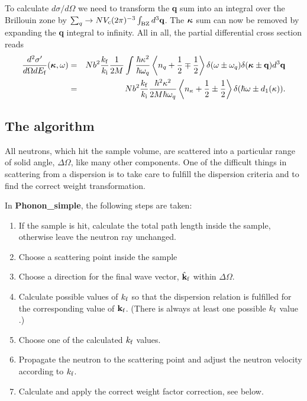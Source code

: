 To calculate $d\sigma/d\Omega$ we need to transform the 
{\bf q} sum into an integral over the Brillouin zone by 
$\sum_q \rightarrow N V_{\rm c} (2\pi)^{-3} \int_{\rm BZ} d^3{\bf q}$.
The $\mbox{\boldmath $\kappa$}$ sum can now be removed by
expanding the {\bf q} integral to infinity. 
All in all, the partial differential cross section reads
\begin{eqnarray}
\frac{d^2\sigma'}{d\Omega dE_{\rm f}}
  (\mbox{\boldmath $\kappa$},\omega) &=&
  N b^2 \frac{k_{\rm f}}{k_{\rm i}} \frac{1}{2M} 
  \int \frac{\hbar \kappa^2}{\hbar \omega_q} 
  \left\langle n_{q}+\frac{1}{2}\mp\frac{1}{2} \right\rangle
  \delta(\omega\pm\omega_{q}) \delta(\mbox{\boldmath $\kappa$}\pm{\bf q}) 
   d^3{\bf q} \nonumber \\
 &=& N b^2 \frac{k_{\rm f}}{k_{\rm i}}  
          \frac{\hbar^2 \kappa^2}{2M \hbar \omega_q} 
  \left\langle n_{\kappa}+\frac12\pm\frac12 \right\rangle 
  \delta(\hbar\omega\pm d_1(\kappa)) . \label{e:phonon-pdcross}
\end{eqnarray}

\subsection{The algorithm}
All neutrons, which hit the sample volume, are scattered
into a particular range of solid angle, $\Delta \Omega$,
like many other components. One of the difficult things in 
scattering from a dispersion is to take care to fulfill the 
dispersion criteria and to find the correct weight transformation.

In {\bf Phonon\_simple}, the following steps are taken:
\begin{enumerate}
\item If the sample is hit, calculate the total path length inside the
sample, otherwise leave the neutron ray unchanged.
\item Choose a scattering point inside the sample
\item Choose a direction for the final wave vector, $\hat{\bf k}_{\rm f}$ 
within $\Delta\Omega$.
\item Calculate possible values of $k_{\rm f}$ so that the
dispersion relation is fulfilled for the corresponding value
of ${\bf k}_{\rm f}$. (There is always at least one possible $k_{\rm f}$
value \cite{bacon}.)
\item Choose one of the calculated $k_{\rm f}$ values.
\item Propagate the neutron to the scattering point and adjust the 
neutron velocity according to $k_{\rm f}$.
\item Calculate and apply the correct weight factor correction, see below.
\end{enumerate}

